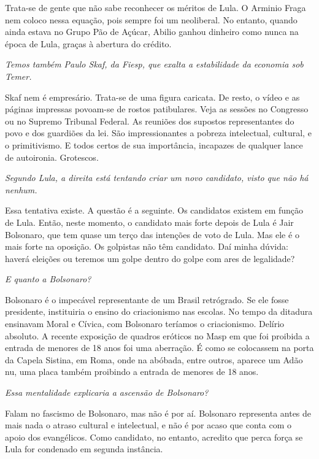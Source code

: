 \normalfont 
Trata-se de gente que não sabe reconhecer os méritos de
Lula. O Arminio Fraga nem coloco nessa equação, pois sempre foi um
neoliberal. No entanto, quando ainda estava no Grupo Pão de Açúcar,
Abilio ganhou dinheiro como nunca na época de Lula, graças à abertura do
crédito.

\itshape
 Temos também Paulo Skaf, da Fiesp, que exalta a
estabilidade da economia sob Temer.

\normalfont 
Skaf nem é empresário. Trata-se de uma figura caricata.
De resto, o vídeo e as páginas impressas povoam-se de rostos
patibulares. Veja as sessões no Congresso ou no Supremo Tribunal
Federal. As reuniões dos supostos representantes do povo e dos guardiões
da lei. São impressionantes a pobreza intelectual, cultural, e o
primitivismo. E todos certos de sua importância, incapazes de qualquer
lance de autoironia. Grotescos.

\itshape
 Segundo Lula, a direita está tentando criar um novo
candidato, visto que não há nenhum.

\normalfont 
Essa tentativa existe. A questão é a seguinte. Os
candidatos existem em função de Lula. Então, neste momento, o candidato
mais forte depois de Lula é Jair Bolsonaro, que tem quase um terço das
intenções de voto de Lula. Mas ele é o mais forte na oposição. Os
golpistas não têm candidato. Daí minha dúvida: haverá eleições ou
teremos um golpe dentro do golpe com ares de legalidade?

\itshape
 E quanto a Bolsonaro?

\normalfont 
Bolsonaro é o impecável representante de um Brasil
retrógrado. Se ele fosse presidente, instituiria o ensino do
criacionismo nas escolas. No tempo da ditadura ensinavam Moral e Cívica,
com Bolsonaro teríamos o criacionismo. Delírio absoluto. A recente
exposição de quadros eróticos no Masp em que foi proibida a entrada de
menores de 18 anos foi uma aberração. É como se colocassem na porta da
Capela Sistina, em Roma, onde na abóbada, entre outros, aparece um Adão
nu, uma placa também proibindo a entrada de menores de 18 anos.

\itshape
 Essa mentalidade explicaria a ascensão de Bolsonaro?

\normalfont 
Falam no fascismo de Bolsonaro, mas não é por aí.
Bolsonaro representa antes de mais nada o atraso cultural e intelectual,
e não é por acaso que conta com o apoio dos evangélicos. Como candidato,
no entanto, acredito que perca força se Lula for condenado em segunda
instância.

